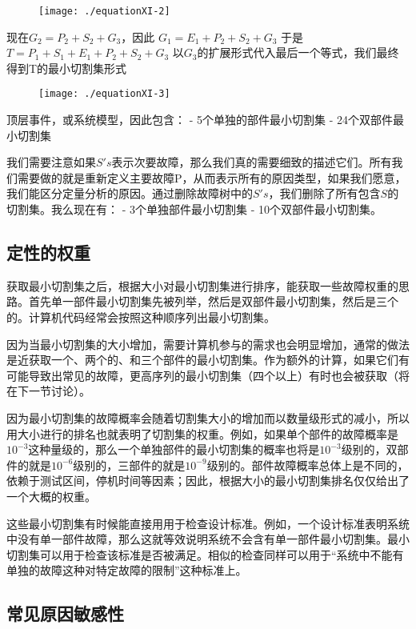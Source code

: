 \documentclass[cn,11pt,chinese]{elegantbook}
\begin{document}
{\begin{figure}
	\texttt{[image: ./equationXI-2]}
\end{figure}

现在$G_2=P_2+S_2+G_3$，因此
$G_1=E_1+P_2+S_2+G_3$
于是$T=P_1+S_1+E_1+P_2+S_2+G_3$
以$G_3$的扩展形式代入最后一个等式，我们最终得到T的最小切割集形式

\begin{figure}
	\texttt{[image: ./equationXI-3]}
\end{figure}

顶层事件，或系统模型，因此包含：
- 5个单独的部件最小切割集
- 24个双部件最小切割集

我们需要注意如果$S's$表示次要故障，那么我们真的需要细致的描述它们。所有我们需要做的就是重新定义主要故障P，从而表示所有的原因类型，如果我们愿意，我们能区分定量分析的原因。通过删除故障树中的$S's$，我们删除了所有包含$S$的切割集。我么现在有：
- 3个单独部件最小切割集
- 10个双部件最小切割集。

\subsection{定性的权重}

获取最小切割集之后，根据大小对最小切割集进行排序，能获取一些故障权重的思路。首先单一部件最小切割集先被列举，然后是双部件最小切割集，然后是三个的。计算机代码经常会按照这种顺序列出最小切割集。

因为当最小切割集的大小增加，需要计算机参与的需求也会明显增加，通常的做法是近获取一个、两个的、和三个部件的最小切割集。作为额外的计算，如果它们有可能导致出常见的故障，更高序列的最小切割集（四个以上）有时也会被获取（将在下一节讨论）。

因为最小切割集的故障概率会随着切割集大小的增加而以数量级形式的减小，所以用大小进行的排名也就表明了切割集的权重。例如，如果单个部件的故障概率是$10^{-3}$这种量级的，那么一个单独部件的最小切割集的概率也将是$10^{-3}$级别的，双部件的就是$10^{-6}$级别的，三部件的就是$10^{-9}$级别的。部件故障概率总体上是不同的，依赖于测试区间，停机时间等因素；因此，根据大小的最小切割集排名仅仅给出了一个大概的权重。

这些最小切割集有时候能直接用用于检查设计标准。例如，一个设计标准表明系统中没有单一部件故障，那么这就等效说明系统不会含有单一部件最小切割集。最小切割集可以用于检查该标准是否被满足。相似的检查同样可以用于“系统中不能有单独的故障这种对特定故障的限制”这种标准上。

\subsection{常见原因敏感性}

}
\end{document}
